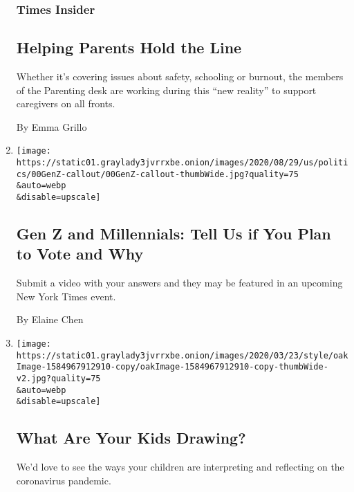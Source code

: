 \begin{enumerate}
{  \subsubsection{Times Insider}\label{times-insider-6}}

  \hypertarget{helping-parents-hold-the-line}{%
  \subsection{Helping Parents Hold the
  Line}\label{helping-parents-hold-the-line}}

  Whether it's covering issues about safety, schooling or burnout, the
  members of the Parenting desk are working during this ``new reality''
  to support caregivers on all fronts.

  By Emma Grillo
\item
  \href{/2020/08/24/reader-center/gen-z-millennials-vote-callout.html}{}

  \texttt{[image: https://static01.graylady3jvrrxbe.onion/images/2020/08/29/us/politics/00GenZ-callout/00GenZ-callout-thumbWide.jpg?quality=75\\\&auto=webp\\\&disable=upscale]}

  \hypertarget{gen-z-and-millennials-tell-us-if-you-plan-to-vote-and-why}{%
  \subsection{Gen Z and Millennials: Tell Us if You Plan to Vote and
  Why}\label{gen-z-and-millennials-tell-us-if-you-plan-to-vote-and-why}}

  Submit a video with your answers and they may be featured in an
  upcoming New York Times event.

  By Elaine Chen
\item
  \href{/2020/08/24/education/kids-coronavirus-drawings.html}{}

  \texttt{[image: https://static01.graylady3jvrrxbe.onion/images/2020/03/23/style/oakImage-1584967912910-copy/oakImage-1584967912910-copy-thumbWide-v2.jpg?quality=75\\\&auto=webp\\\&disable=upscale]}

  \hypertarget{what-are-your-kids-drawing}{%
  \subsection{What Are Your Kids
  Drawing?}\label{what-are-your-kids-drawing}}

  We'd love to see the ways your children are interpreting and
  reflecting on the coronavirus pandemic.


\end{enumerate}
